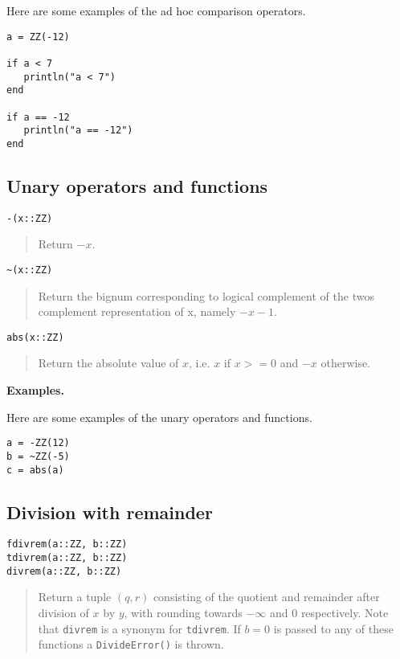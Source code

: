 \documentclass[a4paper,10pt]{article}
\newcommand{\code}{\lstinline}
\newcommand{\desc}[1]{\vspace{-3mm}\begin{quote}#1\end{quote}}
\begin{document}
{{{{{{Here are some examples of the ad hoc comparison operators.

\begin{lstlisting}
a = ZZ(-12)

if a < 7
   println("a < 7")
end

if a == -12
   println("a == -12")
end
\end{lstlisting}

\subsection{Unary operators and functions}

\begin{lstlisting}
-(x::ZZ)
\end{lstlisting}

\desc{Return $-x$.}

\begin{lstlisting}
~(x::ZZ)
\end{lstlisting}

\desc{Return the bignum corresponding to logical complement of the twos 
complement representation of x, namely $-x - 1$.}

\begin{lstlisting}
abs(x::ZZ)
\end{lstlisting}

\desc{Return the absolute value of $x$, i.e. $x$ if $x >= 0$ and $-x$ otherwise.}

\textbf{Examples.}

Here are some examples of the unary operators and functions.

\begin{lstlisting}
a = -ZZ(12)
b = ~ZZ(-5)
c = abs(a)
\end{lstlisting}

\subsection{Division with remainder}

\begin{lstlisting}
fdivrem(a::ZZ, b::ZZ)
tdivrem(a::ZZ, b::ZZ)
divrem(a::ZZ, b::ZZ)
\end{lstlisting}

\desc{Return a tuple $(q, r)$ consisting of the quotient and remainder after 
division of $x$ by $y$, with rounding towards $-\infty$ and $0$ respectively. Note 
that \code{divrem} is a synonym for \code{tdivrem}. If $b = 0$ is passed to any
of these functions a \code{DivideError()} is thrown.}

}}}}}}
\end{document}
